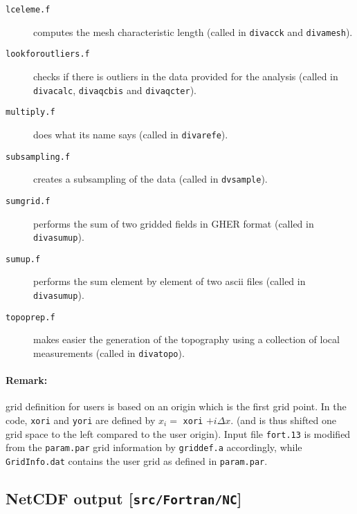 \begin{description}

\item[\texttt{lceleme.f}] computes the mesh characteristic length (called in \texttt{divacck} and \texttt{divamesh}).

\item[\texttt{lookforoutliers.f}] checks if there is outliers in the data provided for the analysis (called in \texttt{divacalc}, \texttt{divaqcbis} and \texttt{divaqcter}).

\item[\texttt{multiply.f}] does what its name says (called in \texttt{divarefe}).

\item[\texttt{subsampling.f}] creates a subsampling of the data (called in \texttt{dvsample}).

\item[\texttt{sumgrid.f}] performs the sum of two gridded fields in GHER format (called in \texttt{divasumup}).

\item[\texttt{sumup.f}] performs the sum element by element of two ascii files (called in \texttt{divasumup}).

\item[\texttt{topoprep.f}] makes easier the generation of the topography using a collection of local measurements (called in \texttt{divatopo}).

\end{description}

\paragraph{Remark:} grid definition for users is based on an origin which is the first grid point. 
In the code, \texttt{xori} and \texttt{yori} are defined by $x_i=$ \texttt{xori} $+i \Delta x$.
(and is thus shifted one grid space to the left compared to the user origin). Input file \texttt{fort.13} is modified from the \texttt{param.par} grid information by \texttt{griddef.a} accordingly, while \texttt{GridInfo.dat} contains the user grid as defined in \texttt{param.par}.


\subsection[NetCDF output]{NetCDF output [\texttt{src/Fortran/NC}]}

